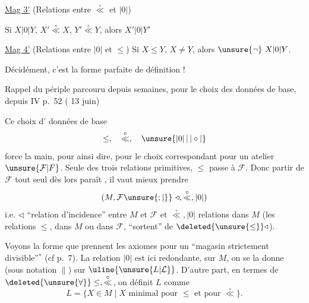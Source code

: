 \uline{Mag 3'} (Relations entre $\overset{\circ}{\ll}$ et $|0|$)

Si $X|0|Y$, $X'\overset{\circ}{\ll}X$, $Y'\overset{\circ}{\ll}Y$, alors $X'|0|Y'$

\uline{Mag 4'} (Relations entre $|0|$ et $\leq$) Si $X\leq Y$, $X\neq Y$, alors $\unsure{\neg}\ X|0|Y$.

Décidément, c'est la forme parfaite de définition !

Rappel du périple parcouru depuis  semaines, pour le choix des données de base, depuis  IV p.~52 ( 13 juin)



Ce choix d' données de base
\[
\leq,\quad\overset{\circ}{\ll},\quad\unsure{|0|\,|\,|\circ|}
\]
force la main, pour ainsi dire, pour le choix correspondant pour  un atelier $\unsure{\mathcal F|F}$. Seule des trois relations primitives, $\leq$ passe à $\mathcal F$. Donc partir de $\mathcal F$ tout seul dès lors paraît , il vaut mieux prendre 
\[
(M,\mathcal F\unsure{;|\}}\ \triangleleft,\overset{\circ}{\ll},|0|)
\]
i.e. $\triangleleft$ ``relation d'incidence'' entre $M$ et $\mathcal F$ et $\overset{\circ}{\ll},|0|$ relations dans $M$ (les relations $\leq$, dans $M$ ou dans $\mathcal F$, ``sortent'' de $\deleted{\unsure{\leq}}\triangleleft$).

Voyons la forme que prennent les  axiomes pour un ``magasin strictement divisible''$^\ast$ (cf p.~7). La relation $|0|$ est ici redondante,  sur $M$, on se la donne (sous notation $\parallel$) sur $\uline{\unsure{L|\mathcal L}}$. D'autre part, en termes de $\deleted{\unsure{\forall}}\leq,\overset{\circ}{\ll}$, on définit $L$ comme
\[
L=\{X\in M\mid X\text{ minimal pour }\leq\text{ et pour }\overset{\circ}{\ll}\}.
\]

